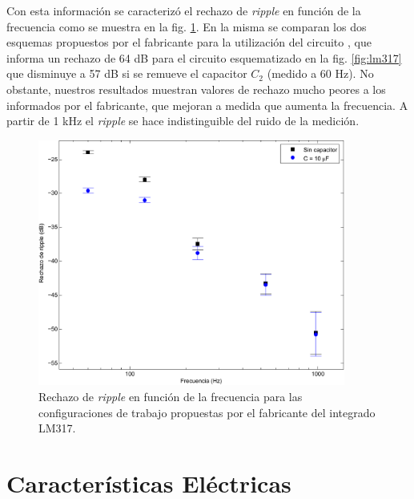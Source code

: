 \documentclass[a4paper,11pt]{article}
\begin{document}
Con esta información se caracterizó el rechazo de \textit{ripple} en función de la frecuencia como se muestra en la fig. \ref{fig:rechazo}. En la misma se comparan los dos esquemas propuestos por el fabricante para la utilización del circuito \cite{datasheetlm317}, que informa un rechazo de 64 dB para el circuito esquematizado en la fig. \ref{fig:lm317} que disminuye a 57 dB si se remueve el capacitor $C_2$ (medido a 60 Hz). No obstante, nuestros resultados muestran valores de rechazo mucho peores a los informados por el fabricante, que mejoran a medida que aumenta la frecuencia. A partir de 1 kHz el \textit{ripple} se hace indistinguible del ruido de la medición.

	\begin{figure}[h]
		\centering
		\includegraphics[width=0.9\textwidth]{imagenes/rechazoriple.pdf}
		\caption{Rechazo de \textit{ripple} en función de la frecuencia para las configuraciones de trabajo propuestas por el fabricante del integrado LM317.}
		\label{fig:rechazo}
	\end{figure}

\clearpage


\section{Características Eléctricas}
\end{document}
